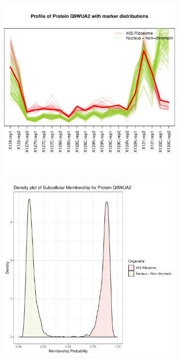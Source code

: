 \documentclass[12pt,english]{article}\usepackage[]{graphicx}\usepackage[]{color}
\makeatletter
\def\maxwidth{ %
  \ifdim\Gin@nat@width>\linewidth
    \linewidth
  \else
    \Gin@nat@width
  \fi
}
\newenvironment{knitrout}{}{} %
\makeatother
\begin{document}
\begin{figure}[p]
\begin{subfigure}[t]{0.5\textwidth}
\begin{knitrout}
{\centering \includegraphics[width=\maxwidth]{figure/Q9WUA2-prof-1} 

}



\end{knitrout}
    \caption{}
  \end{subfigure}
  \vspace{1cm}
  \begin{subfigure}[t]{0.5\textwidth}
    \centering
\begin{knitrout}
\color{fgcolor}

{\centering \includegraphics[width=\maxwidth]{figure/Q9WUA2-dens-1} 

}
\end{knitrout}
\end{subfigure}
\end{figure}
\end{document}
